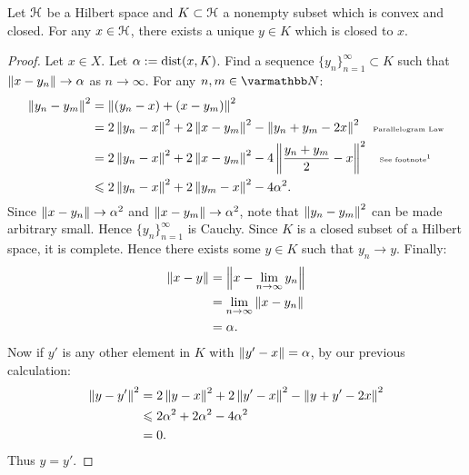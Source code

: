 \begin{theorem}\label{thm:hs-closest-element}
    Let $\mathcal{H}$ be a Hilbert space and $K \subset \mathcal{H}$ a nonempty subset which is convex and closed. For any $x \in \mathcal{H}$, there exists a unique $y \in K$ which is closed to $x$.
\end{theorem}
    \begin{proof}
        Let $x \in X$. Let $\alpha := \operatorname{dist}(x,K)$. Find a sequence $\{y_n\}_{n = 1}^\infty \subset K$ such that $\left\lVert x - y_n \right\rVert \rightarrow \alpha$ as $n \rightarrow \infty$. For any $n,m \in \bfN$:
            \begin{equation*}
            \begin{split}
                \lnorm y_n  - y_m\rnorm^2 
                & = \lnorm (y_n - x) + (x-y_m) \rnorm^2 \\
                & = 2 \lnorm y_n - x \rnorm^2 + 2 \lnorm x - y_m \rnorm^2 - \lnorm y_n + y_m - 2x \rnorm^2 \h9\text{\tiny Parallelogram Law} \\
                & = 2 \lnorm y_n - x \rnorm^2 + 2 \lnorm x - y_m \rnorm^2 - 4\lnorm \frac{y_n + y_m}{2} - x \rnorm^2 \h9\text{\tiny See footnote\footnotemark}\\
                & \leq 2 \lnorm y_n - x \rnorm^2 + 2 \lnorm y_m - x \rnorm^2 - 4 \alpha^2.
            \end{split}
            \end{equation*}
         Since $\left\lVert x - y_n\right\rVert \rightarrow \alpha^2$ and $\left\lVert x - y_m \right\rVert \rightarrow \alpha^2$, note that $\left\lVert y_n - y_m \right\rVert^2$ can be made arbitrary small. Hence $\{y_n\}_{n = 1}^\infty$ is Cauchy.  Since $K$ is a closed subset of a Hilbert space, it is complete. Hence there exists some $y \in K$ such that $y_n \rightarrow y$. Finally:
            \begin{equation*}
            \begin{split}
                \left\lVert x-y \right\rVert
                & = \left\lVert x - \lim_{n \rightarrow \infty}y_n \right\rVert \\
                & = \lim_{n \rightarrow \infty}\left\lVert x - y_n \right\rVert \\
                & = \alpha.
            \end{split}
            \end{equation*}
        Now if $y'$ is any other element in $K$ with $\left\lVert y' - x \right\rVert = \alpha$, by our previous calculation:
            \begin{equation*}
            \begin{split}
                \left\lVert y - y' \right\rVert^2 
                & = 2 \left\lVert y - x \right\rVert^2 + 2 \left\lVert y' - x \right\rVert^2 - \left\lVert y + y' - 2x \right\rVert^2 \\
                & \leqslant 2\alpha^2 + 2\alpha^2 - 4\alpha^2 \\
                & = 0.
            \end{split}
            \end{equation*}
            Thus $y = y'$.
    \end{proof}


